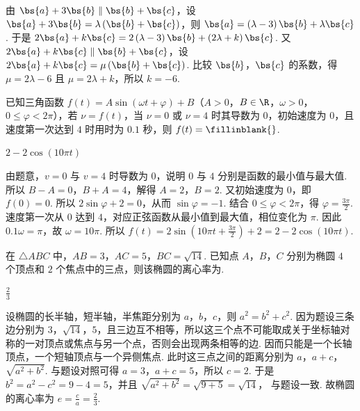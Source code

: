 \documentclass[UTF8,a4paper,oneside,11pt]{ctexbook}
\begin{document}
\begin{solution}
由 \( \bs{a}+3\bs{b}\parallel \bs{b}+\bs{c} \)，设 \( \bs{a}+3\bs{b}=\lambda \left( \bs{b}+\bs{c} \right) \)，则 \( \bs{a}=\left( \lambda-3 \right)\bs{b}+\lambda \bs{c} \). 于是 \( 2\bs{a}+k\bs{c}=2\left( \lambda-3 \right)\bs{b}+\left( 2\lambda+k \right)\bs{c} \).
又 \( 2\bs{a}+k\bs{c}\parallel \bs{b}+\bs{c} \)，设 \( 2\bs{a}+k\bs{c}=\mu \left( \bs{b}+\bs{c} \right) \). 比较 \( \bs{b} \)，\( \bs{c} \) 的系数，得 \( \mu=2\lambda-6 \) 且 \( \mu=2\lambda+k \)，所以 \( k=-6 \).
\end{solution}

\begin{problem}
已知三角函数 \( f(t)=A\sin\left( \omega t+\varphi \right)+B \)（\( A>0 \)，\( B\in \R \)，\( \omega>0 \)，\( 0\le \varphi<2\pi \)），若 \( \nu=f(t) \)，当 \( \nu=0 \) 或 \( \nu=4 \) 时其导数为 \( 0 \)，初始速度为 \( 0 \)，且速度第一次达到 \( 4 \) 时用时为 \( 0.1 \) 秒，则 \( f(t)=\fillinblank{} \).
\end{problem}

\begin{answer}
\(2-2\cos\left( 10\pi t \right)\)
\end{answer}

\begin{solution}
由题意，\( v=0 \) 与 \( v=4 \) 时导数为 \( 0 \)，说明 \( 0 \) 与 \( 4 \) 分别是函数的最小值与最大值. 所以 \( B-A=0 \)，\( B+A=4 \)，解得 \( A=2 \)，\( B=2 \).
又初始速度为 \( 0 \)，即 \( f(0)=0 \). 所以 \( 2\sin \varphi+2=0 \)，从而 \( \sin \varphi=-1 \). 结合 \( 0\le \varphi<2\pi \)，得 \( \varphi=\frac{3\pi}{2} \).
速度第一次从 \( 0 \) 达到 \( 4 \)，对应正弦函数从最小值到最大值，相位变化为 \( \pi \). 因此 \( 0.1\omega=\pi \)，故 \( \omega=10\pi \).
所以 \( f(t)=2\sin\left( 10\pi t+\frac{3\pi}{2} \right)+2=2-2\cos\left( 10\pi t \right) \).
\end{solution}

\begin{problem}
在 \( \triangle ABC \) 中，\( AB=3 \)，\( AC=5 \)，\( BC=\sqrt{14} \). 已知点 \(A\)，\(B\)，\(C\) 分别为椭圆 \( 4 \) 个顶点和 \( 2 \) 个焦点中的三点，则该椭圆的离心率为\fillinblank{}.
\end{problem}

\begin{answer}
\(\frac{2}{3}\)
\end{answer}

\begin{solution}
设椭圆的长半轴，短半轴，半焦距分别为 \( a \)，\( b \)，\( c \)，则 \( a^2=b^2+c^2 \).
因为题设三条边分别为 \( 3 \)，\( \sqrt{14} \)，\( 5 \)，且三边互不相等，所以这三个点不可能取成关于坐标轴对称的一对顶点或焦点与另一个点，否则会出现两条相等的边. 因而只能是一个长轴顶点，一个短轴顶点与一个异侧焦点.
此时这三点之间的距离分别为 \( a \)，\( a+c \)，\( \sqrt{a^2+b^2} \). 与题设对照可得 \( a=3 \)，\( a+c=5 \)，所以 \( c=2 \). 于是 \( b^2=a^2-c^2=9-4=5 \)，并且 \( \sqrt{a^2+b^2}=\sqrt{9+5}=\sqrt{14} \)，
与题设一致.
故椭圆的离心率为 \( e=\frac{c}{a}=\frac{2}{3} \).
\end{solution}
\end{document}
